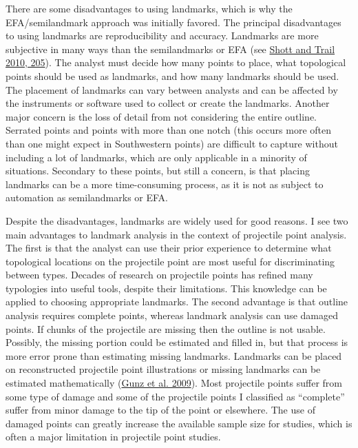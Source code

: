 \documentclass{article}
\begin{document}
There are some disadvantages to using landmarks, which is why the
EFA/semilandmark approach was initially favored. The principal
disadvantages to using landmarks are reproducibility and accuracy.
Landmarks are more subjective in many ways than the semilandmarks or EFA
(see \protect\hyperlink{ref-Shott2010-fn}{Shott and Trail 2010, 205}).
The analyst must decide how many points to place, what topological
points should be used as landmarks, and how many landmarks should be
used. The placement of landmarks can vary between analysts and can be
affected by the instruments or software used to collect or create the
landmarks. Another major concern is the loss of detail from not
considering the entire outline. Serrated points and points with more
than one notch (this occurs more often than one might expect in
Southwestern points) are difficult to capture without including a lot of
landmarks, which are only applicable in a minority of situations.
Secondary to these points, but still a concern, is that placing
landmarks can be a more time-consuming process, as it is not as subject
to automation as semilandmarks or EFA.

Despite the disadvantages, landmarks are widely used for good reasons. I
see two main advantages to landmark analysis in the context of
projectile point analysis. The first is that the analyst can use their
prior experience to determine what topological locations on the
projectile point are most useful for discriminating between types.
Decades of research on projectile points has refined many typologies
into useful tools, despite their limitations. This knowledge can be
applied to choosing appropriate landmarks. The second advantage is that
outline analysis requires complete points, whereas landmark analysis can
use damaged points. If chunks of the projectile are missing then the
outline is not usable. Possibly, the missing portion could be estimated
and filled in, but that process is more error prone than estimating
missing landmarks. Landmarks can be placed on reconstructed projectile
point illustrations or missing landmarks can be estimated mathematically
(\protect\hyperlink{ref-Gunz2009-yb}{Gunz et al. 2009}). Most projectile
points suffer from some type of damage and some of the projectile points
I classified as ``complete'' suffer from minor damage to the tip of the
point or elsewhere. The use of damaged points can greatly increase the
available sample size for studies, which is often a major limitation in
projectile point studies.
\end{document}
